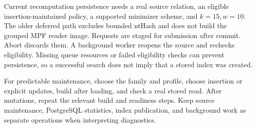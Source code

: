 Current recomputation persistence needs a real source relation, an
eligible insertion-maintained policy, a supported minimizer scheme, and
$k=15,w=10$. The older deferred path excludes bounded ntHash and does not
build the grouped MPF reader image. Requests are staged for submission
after commit. Abort discards them. A background worker reopens the source
and rechecks eligibility. Missing queue resources or failed eligibility
checks can prevent persistence, so a successful search does not imply
that a stored index was created.

For predictable maintenance, choose the family and profile, choose
insertion or explicit updates, build after loading, and check a real
stored read. After mutations, repeat the relevant build and readiness
steps. Keep source maintenance, PostgreSQL statistics, index publication,
and background work as separate operations when interpreting diagnostics.
